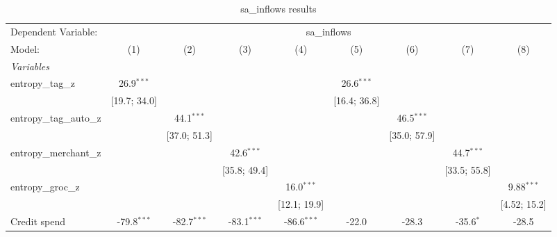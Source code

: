 
\begin{table}[htbp]
   \centering
   \tiny
   \begin{threeparttable}[b]
      \caption{\label{tab:reg_sa_inflows_full} sa\_inflows results}
      \begin{tabular}{lcccccccc}
         \tabularnewline \midrule \midrule
         Dependent Variable: & \multicolumn{8}{c}{sa\_inflows}\\
         Model:                   & (1)             & (2)             & (3)             & (4)             & (5)             & (6)             & (7)             & (8)\\  
         \midrule
         \emph{Variables}\\
         entropy\_tag\_z          & 26.9$^{***}$    &                 &                 &                 & 26.6$^{***}$    &                 &                 &   \\   
                                  & [19.7; 34.0]    &                 &                 &                 & [16.4; 36.8]    &                 &                 &   \\   
         entropy\_tag\_auto\_z    &                 & 44.1$^{***}$    &                 &                 &                 & 46.5$^{***}$    &                 &   \\   
                                  &                 & [37.0; 51.3]    &                 &                 &                 & [35.0; 57.9]    &                 &   \\   
         entropy\_merchant\_z     &                 &                 & 42.6$^{***}$    &                 &                 &                 & 44.7$^{***}$    &   \\   
                                  &                 &                 & [35.8; 49.4]    &                 &                 &                 & [33.5; 55.8]    &   \\   
         entropy\_groc\_z         &                 &                 &                 & 16.0$^{***}$    &                 &                 &                 & 9.88$^{***}$\\   
                                  &                 &                 &                 & [12.1; 19.9]    &                 &                 &                 & [4.52; 15.2]\\   
         Credit spend             & -79.8$^{***}$   & -82.7$^{***}$   & -83.1$^{***}$   & -86.6$^{***}$   & -22.0           & -28.3           & -35.6$^{*}$     & -28.5\\   

\end{tabular}
\end{threeparttable}
\end{table}
